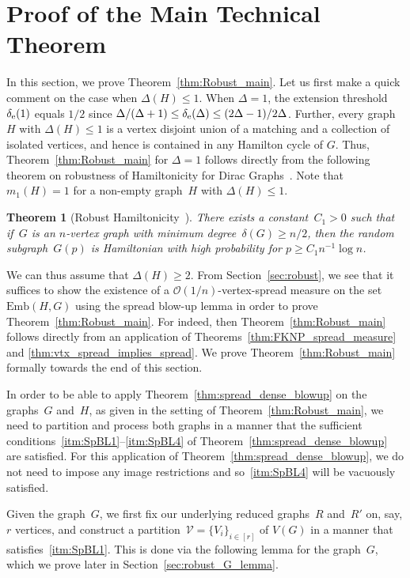 \documentclass[final]{article}
\newtheorem{theorem}{Theorem}[section]
\theoremstyle{definition}
\newcommand{\Emb}{\mathrm{Emb}}
\newcommand{\exth}{\delta_{\rm e}(\Delta)}
\begin{document}
\section{Proof of the Main Technical Theorem}
\label{sec:robust_overview}

In this section, we prove Theorem~\ref{thm:Robust_main}. Let us first make a quick comment on the case when $\Delta(H) \leq 1$. When $\Delta = 1$, the extension threshold~$\delta_{\rm e}(1)$ equals $1/2$ since $\Delta/(\Delta+1) \leq \exth \leq (2\Delta -1)/2\Delta$. Further, every graph~$H$ with $\Delta(H) \leq 1$ is a vertex disjoint union of a matching and a collection of isolated vertices, and hence is contained in any Hamilton cycle of $G$. Thus, Theorem~\ref{thm:Robust_main} for $\Delta = 1$ follows directly from the following theorem on robustness of Hamiltonicity for Dirac Graphs~\cite{robust_hamiltonicity}. Note that $m_1(H) = 1$ for a non-empty graph~$H$ with $\Delta(H) \leq 1$. 

\begin{theorem}[Robust Hamiltonicity~\cite{robust_hamiltonicity}]
\label{thm:Hamilton_robust}
There exists a constant~$C_1 > 0$ such that if~$G$ is an $n$-vertex graph with minimum degree~$\delta(G) \geq n/2$, then the random subgraph~$G(p)$ is Hamiltonian with high probability for $p \geq C_1 n^{-1} \log n$.
\end{theorem}

We can thus assume that $\Delta(H) \geq 2$. From Section~\ref{sec:robust}, we see that it suffices to show the existence of a $\mathcal{O}(1/n)$-vertex-spread measure on the set $\Emb(H,G)$ using the spread blow-up lemma in order to prove Theorem~\ref{thm:Robust_main}. For indeed, then Theorem~\ref{thm:Robust_main} follows directly from an application of Theorems~\ref{thm:FKNP_spread_measure} and \ref{thm:vtx_spread_implies_spread}. We prove Theorem~\ref{thm:Robust_main} formally towards the end of this section. 

In order to be able to apply Theorem~\ref{thm:spread_dense_blowup} on the graphs~$G$ and~$H$, as given in the setting of Theorem~\ref{thm:Robust_main}, we need to partition and process both graphs in a manner that the sufficient conditions~\ref{itm:SpBL1}--\ref{itm:SpBL4} of Theorem~\ref{thm:spread_dense_blowup} are satisfied. For this application of Theorem~\ref{thm:spread_dense_blowup}, we do not need to impose any image restrictions and so~\ref{itm:SpBL4} will be vacuously satisfied.

Given the graph~$G$, we first fix our underlying reduced graphs~$R$ and~$R'$ on, say, $r$ vertices, and construct a partition~$\mathcal{V} = \{V_i\}_{i \in [r]}$ of $V(G)$ in a manner that satisfies~\ref{itm:SpBL1}. This is done via the following lemma for the graph~$G$, which we prove later in Section~\ref{sec:robust_G_lemma}.
\end{document}
